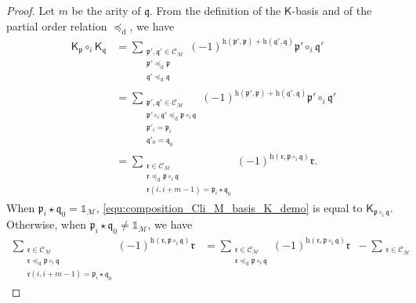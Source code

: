 \documentclass[10pt,reqno]{amsart}
\numberwithin{equation}{subsection}
\newcommand{\Mca}{\mathcal{M}}
\newcommand{\Ksf}{\mathsf{K}}
\newcommand{\Pfr}{\mathfrak{p}}
\newcommand{\Qfr}{\mathfrak{q}}
\newcommand{\Rfr}{\mathfrak{r}}
\newcommand{\Unit}{\mathds{1}}
\newcommand{\Op}{\star}
\newcommand{\Cliques}{\mathcal{C}}
\newcommand{\Hamming}{\mathrm{h}}
\newcommand{\OrdD}{\preceq_{\mathrm{d}}}
\begin{document}
\begin{proof}
    Let $m$ be the arity of $\Qfr$. From the definition of the
    $\Ksf$-basis and of the partial order relation $\OrdD$, we have
    \begin{equation}\begin{split}
        \label{equ:composition_Cli_M_basis_K_demo}
        \Ksf_\Pfr \circ_i \Ksf_\Qfr
        & =
        \sum_{\substack{
            \Pfr', \Qfr' \in \Cliques_\Mca \\
            \Pfr' \OrdD \Pfr \\
            \Qfr' \OrdD \Qfr
        }}
        (-1)^{\Hamming(\Pfr', \Pfr) + \Hamming(\Qfr', \Qfr)}
        \Pfr' \circ_i \Qfr' \\
        & =
        \sum_{\substack{
            \Pfr', \Qfr' \in \Cliques_\Mca \\
            \Pfr' \circ_i \Qfr' \OrdD \Pfr \circ_i \Qfr \\
            \Pfr'_i = \Pfr_i \\
            \Qfr'_0 = \Qfr_0
        }}
        (-1)^{\Hamming(\Pfr', \Pfr) + \Hamming(\Qfr', \Qfr)}
        \Pfr' \circ_i \Qfr' \\
        & =
        \sum_{\substack{
            \Rfr \in \Cliques_\Mca \\
            \Rfr \OrdD \Pfr \circ_i \Qfr \\
            \Rfr(i, i + m - 1) = \Pfr_i \Op \Qfr_0
        }}
        (-1)^{\Hamming(\Rfr, \Pfr \circ_i \Qfr)}
        \Rfr.
    \end{split}\end{equation}
    When $\Pfr_i \Op \Qfr_0 = \Unit_\Mca$,
    \eqref{equ:composition_Cli_M_basis_K_demo} is equal to
    $\Ksf_{\Pfr \circ_i \Qfr}$. Otherwise, when
    $\Pfr_i \Op \Qfr_0 \ne \Unit_\Mca$, we have
    \begin{equation}\begin{split}
        \sum_{\substack{
            \Rfr \in \Cliques_\Mca \\
            \Rfr \OrdD \Pfr \circ_i \Qfr \\
            \Rfr(i, i + m - 1) = \Pfr_i \Op \Qfr_0
        }}
        (-1)^{\Hamming(\Rfr, \Pfr \circ_i \Qfr)}
        \Rfr
        & =
         \sum_{\substack{
            \Rfr \in \Cliques_\Mca \\
            \Rfr \OrdD \Pfr \circ_i \Qfr
        }}
        (-1)^{\Hamming(\Rfr, \Pfr \circ_i \Qfr)}
        \Rfr
        \enspace -
        \sum_{\substack{
            \Rfr \in \Cliques_\Mca \\
}}
\end{split}
\end{equation}
\end{proof}
\end{document}
